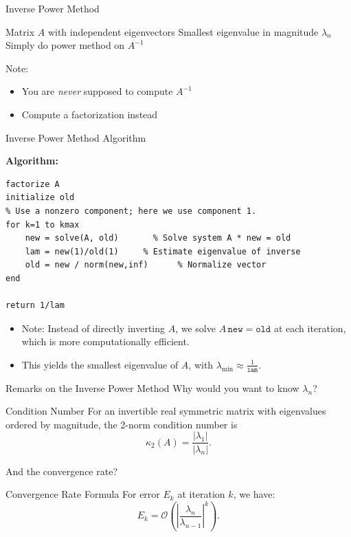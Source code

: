 \documentclass[10pt]{beamer}
\begin{document}
\begin{frame}{Inverse Power Method}

{
{Matrix $A$ with independent eigenvectors}
{Smallest eigenvalue in magnitude $\lambda_n$}
{Simply do power method on $A^{-1}$}
}




\vspace{4mm}
Note:
\begin{itemize}
    \item You are \emph{never} supposed to compute $A^{-1}$
    \item Compute a factorization instead
\end{itemize}
\end{frame}


\begin{frame}[fragile]{Inverse Power Method Algorithm}

\textbf{Algorithm:}
\begin{lstlisting}[mathescape]
factorize A
initialize old
% Use a nonzero component; here we use component 1.
for k=1 to kmax
    new = solve(A, old)       % Solve system A * new = old
    lam = new(1)/old(1)     % Estimate eigenvalue of inverse
    old = new / norm(new,inf)      % Normalize vector
end 

return 1/lam
\end{lstlisting}

\vspace{4mm}

\begin{itemize}
    \item Note: Instead of directly inverting \( A \), we solve \( A \, \texttt{new} = \texttt{old} \) at each iteration, which is more computationally efficient.
    \item This yields the smallest eigenvalue of \( A \), with \( \lambda_{\text{min}} \approx \frac{1}{\texttt{lam}} \).
\end{itemize}
\end{frame}

\begin{frame}{Remarks on the Inverse Power Method}
Why would you want to know $\lambda_n$?
\begin{block}{Condition Number}
    For an invertible real symmetric matrix with eigenvalues ordered by magnitude, the 2-norm condition number is 
        $$\kappa_2(A) = \frac{|\lambda_1|}{|\lambda_n|}.$$
\end{block}
\vspace{3mm}
And the convergence rate?
\begin{block}{Convergence Rate Formula}
    For error \( E_k \) at iteration \( k \), we have:
    \[
    E_k = \mathcal{O} \left( \left| \frac{\lambda_n}{\lambda_{n-1}} \right|^k \right).
    \]
\end{block}
\end{frame}
\end{document}
